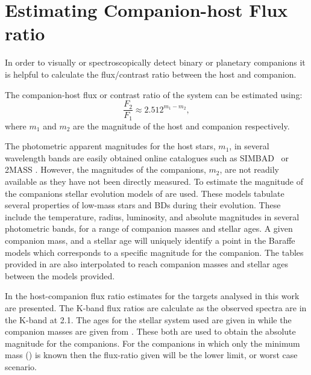 \section{Estimating Companion-host Flux ratio}
\label{sec:compaion_flux_ratio}
In order to visually or spectroscopically detect binary or planetary companions it is helpful to calculate the flux/contrast ratio between the host and companion.

The companion-host flux or contrast ratio of the system can be estimated using:
\begin{equation}
\frac{F_{2}}{F_{1}} \approx 2.512^{m_{1} - m_{2}}, \label{eqn:mag_flux_ratios}
\end{equation}
where \(m_{1}\) and \(m_{2}\) are the magnitude of the host and companion respectively.

The photometric apparent magnitudes for the host stars, \(m_{1}\), in several wavelength bands are easily obtained online catalogues such as {SIMBAD}~\citep{wenger_simbad_2000} or {2MASS} \citep{skrutskie_two_2006}.
However, the magnitudes of the companions, \(m_{2}\), are not readily available as they have not been directly measured.
To estimate the magnitude of the companions stellar evolution models of \citet{baraffe_evolutionary_2003, baraffe_new_2015} are used.
These models tabulate several properties of low-mass stars and BDs during their evolution.
These include the temperature, radius, luminosity, and absolute magnitudes in several photometric bands, for a range of companion masses and stellar ages.
A given companion mass, and a stellar age will uniquely identify a point in the Baraffe models which corresponds to a specific magnitude for the companion.
The tables provided in \citet{baraffe_evolutionary_2003, baraffe_new_2015} are also interpolated to reach companion masses and stellar ages between the models provided.

In  the host-companion flux ratio estimates for the targets analysed in this work are presented. The {K}-band flux ratios are calculate as the observed spectra are in the {K}-band at 2.1\um{}. The ages for the stellar system used are given in  while the companion masses are given from . These both are used to obtain the absolute magnitude for the companions.  For the companions in which only the minimum mass (\mtwosini{}) is known then the flux-ratio given will be the lower limit, or worst case scenario.


